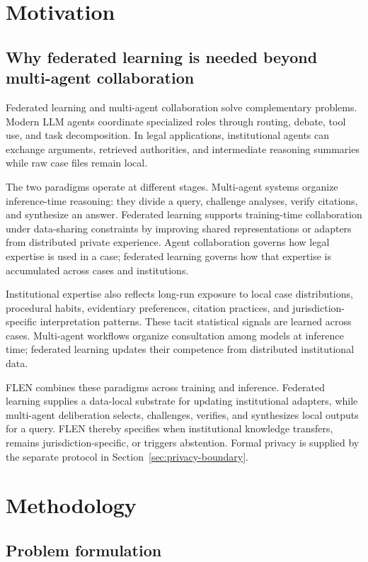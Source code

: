 \documentclass[a4paper,fleqn]{cas-sc}
\begin{document}
\section{Motivation}
\subsection{Why federated learning is needed beyond multi-agent collaboration}
Federated learning and multi-agent collaboration solve complementary problems. Modern LLM agents coordinate specialized roles through routing, debate, tool use, and task decomposition. In legal applications, institutional agents can exchange arguments, retrieved authorities, and intermediate reasoning summaries while raw case files remain local.

The two paradigms operate at different stages. Multi-agent systems organize inference-time reasoning: they divide a query, challenge analyses, verify citations, and synthesize an answer. Federated learning supports training-time collaboration under data-sharing constraints by improving shared representations or adapters from distributed private experience. Agent collaboration governs how legal expertise is used in a case; federated learning governs how that expertise is accumulated across cases and institutions.

Institutional expertise also reflects long-run exposure to local case distributions, procedural habits, evidentiary preferences, citation practices, and jurisdiction-specific interpretation patterns. These tacit statistical signals are learned across cases. Multi-agent workflows organize consultation among models at inference time; federated learning updates their competence from distributed institutional data.

FLEN combines these paradigms across training and inference. Federated learning supplies a data-local substrate for updating institutional adapters, while multi-agent deliberation selects, challenges, verifies, and synthesizes local outputs for a query. FLEN thereby specifies when institutional knowledge transfers, remains jurisdiction-specific, or triggers abstention. Formal privacy is supplied by the separate protocol in Section~\ref{sec:privacy-boundary}.



\section{Methodology}

\subsection{Problem formulation}
\end{document}
